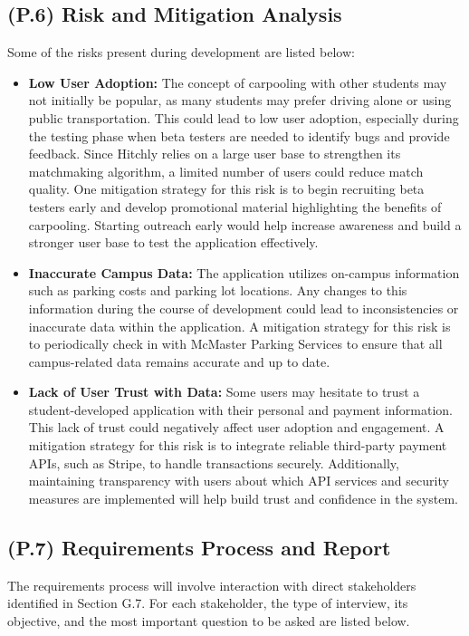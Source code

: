 \documentclass[12pt,letterpaper]{article}
\begin{document}
\subsection{(P.6) Risk and Mitigation Analysis}
Some of the risks present during development are listed below:

\begin{itemize}
    \item \textbf{Low User Adoption:} The concept of carpooling with other students may not initially be popular, as many students may prefer driving alone or using public transportation. This could lead to low user adoption, especially during the testing phase when beta testers are needed to identify bugs and provide feedback. Since Hitchly relies on a large user base to strengthen its matchmaking algorithm, a limited number of users could reduce match quality. One mitigation strategy for this risk is to begin recruiting beta testers early and develop promotional material highlighting the benefits of carpooling. Starting outreach early would help increase awareness and build a stronger user base to test the application effectively.

    \item \textbf{Inaccurate Campus Data:} The application utilizes on-campus information such as parking costs and parking lot locations. Any changes to this information during the course of development could lead to inconsistencies or inaccurate data within the application. A mitigation strategy for this risk is to periodically check in with McMaster Parking Services to ensure that all campus-related data remains accurate and up to date.

    \item \textbf{Lack of User Trust with Data:} Some users may hesitate to trust a student-developed application with their personal and payment information. This lack of trust could negatively affect user adoption and engagement. A mitigation strategy for this risk is to integrate reliable third-party payment APIs, such as Stripe, to handle transactions securely. Additionally, maintaining transparency with users about which API services and security measures are implemented will help build trust and confidence in the system.
\end{itemize}

\subsection{(P.7) Requirements Process and Report}
The requirements process will involve interaction with direct stakeholders identified in Section G.7.  
For each stakeholder, the type of interview, its objective, and the most important question to be asked are listed below.
\end{document}
